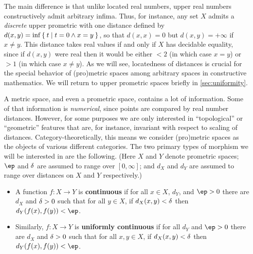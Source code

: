 \documentclass{article}
\def\Rp{[0,\infty]}
\begin{document}
The main difference is that unlike located real numbers, upper real numbers constructively admit arbitrary infima.
Thus, for instance, any set $X$ admits a \emph{discrete} upper prometric with one distance defined by $d(x,y) = \inf \Set{ t | t=0 \land x=y }$, so that $d(x,x)=0$ but $d(x,y)=+\infty$ if $x\neq y$.
This distance takes real values if and only if $X$ has decidable equality, since if $d(x,y)$ were real then it would be either $<2$ (in which case $x=y$) or $>1$ (in which case $x\neq y$).
As we will see, locatedness of distances is crucial for the special behavior of (pro)metric spaces among arbitrary spaces in constructive mathematics.
We will return to upper prometric spaces briefly in \cref{sec:uniformity}.

A metric space, and even a prometric space, contains a lot of information.
Some of that information is \emph{numerical}, since points are compared by real number distances.
However, for some purposes we are only interested in ``topological'' or ``geometric'' features that are, for instance, invariant with respect to scaling of distances.
Category-theoretically, this means we consider (pro)metric spaces as the objects of various different categories.
The two primary types of morphism we will be interested in are the following.
(Here $X$ and $Y$ denote prometric spaces; $\ep$ and $\delta$ are assumed to range over $\Rp$; and $d_X$ and $d_Y$ are assumed to range over distances on $X$ and $Y$ respectively.)

\begin{itemize}
\item A function $f:X\to Y$ is \textbf{continuous} if for all $x\in X$, $d_Y$, and $\ep>0$ there are $d_X$ and $\delta>0$ such that for all $y\in X$, if $d_X(x,y)<\delta$ then $d_Y(f(x),f(y))<\ep$.
\item Similarly, $f:X\to Y$ is \textbf{uniformly continuous} if for all $d_Y$ and $\ep>0$ there are $d_X$ and $\delta>0$ such that for all $x,y\in X$, if $d_X(x,y)<\delta$ then $d_Y(f(x),f(y))<\ep$.
\end{itemize}
\end{document}
